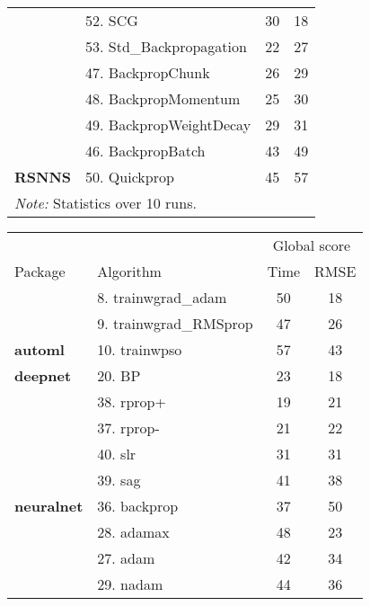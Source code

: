 \begin{table}
\begin{tabular}[t]{>{}llcc}
 & 52. SCG & 30 & 18\\

 & 53. Std\_Backpropagation & 22 & 27\\

 & 47. BackpropChunk & 26 & 29\\

 & 48. BackpropMomentum & 25 & 30\\

 & 49. BackpropWeightDecay & 29 & 31\\

 & 46. BackpropBatch & 43 & 49\\

\multirow{-8}{*}{\raggedright\arraybackslash \textbf{RSNNS}} & 50. Quickprop & 45 & 57\\
\bottomrule
\multicolumn{4}{l}{\rule{0pt}{1em}\textit{Note: } Statistics over 10 runs.}\\
\end{tabular}
\begin{tabular}[t]{>{}llcc}
\toprule
\multicolumn{2}{c}{ } & \multicolumn{2}{c}{Global score} \\
\cmidrule(l{3pt}r{3pt}){3-4}
Package & Algorithm & Time & RMSE\\
\midrule
 & 8. trainwgrad\_adam & 50 & 18\\

 & 9. trainwgrad\_RMSprop & 47 & 26\\

\multirow{-3}{*}{\raggedright\arraybackslash \textbf{automl}} & 10. trainwpso & 57 & 43\\
\cmidrule{1-4}
\textbf{deepnet} & 20. BP & 23 & 18\\
\cmidrule{1-4}
 & 38. rprop+ & 19 & 21\\

 & 37. rprop- & 21 & 22\\

 & 40. slr & 31 & 31\\

 & 39. sag & 41 & 38\\

\multirow{-5}{*}{\raggedright\arraybackslash \textbf{neuralnet}} & 36. backprop & 37 & 50\\
\cmidrule{1-4}
 & 28. adamax & 48 & 23\\

 & 27. adam & 42 & 34\\

 & 29. nadam & 44 & 36\\


\end{tabular}
\end{table}
